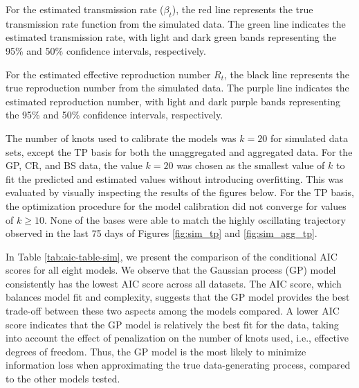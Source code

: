 \documentclass[
11pt, %
oneside, %
english, %
singlespacing, %
]{macthesis} %
\begin{document}
For the estimated transmission rate (\(\beta_t\)), the red line represents the true transmission rate function from the simulated data. The green line indicates the estimated transmission rate, with light and dark green bands representing the 95\% and 50\% confidence intervals, respectively.

For the estimated effective reproduction number \(R_t\), the black line represents the true reproduction number from the simulated data. The purple line indicates the estimated reproduction number, with light and dark purple bands representing the 95\% and 50\% confidence intervals, respectively.

The number of knots used to calibrate the models was \(k =20\) for simulated data sets, except the TP basis for both the unaggregated and aggregated data. For the GP, CR, and BS data, the value \(k =20\) was chosen as the smallest value of \(k\) to fit the predicted and estimated values without introducing overfitting. This was evaluated by visually inspecting the results of the figures below. For the TP basis, the optimization procedure for the model calibration did not converge for values of \(k \geq 10\). None of the bases were able to match the highly oscillating trajectory observed in the last 75 days of Figures \ref{fig:sim_tp} and \ref{fig:sim_agg_tp}.

In Table \ref{tab:aic-table-sim}, we present the comparison of the conditional AIC scores for all eight models. We observe that the Gaussian process (GP) model consistently has the lowest AIC score across all datasets. The AIC score, which balances model fit and complexity, suggests that the GP model provides the best trade-off between these two aspects among the models compared. A lower AIC score indicates that the GP model is relatively the best fit for the data, taking into account the effect of penalization on the number of knots used, i.e., effective degrees of freedom. Thus, the GP model is the most likely to minimize information loss when approximating the true data-generating process, compared to the other models tested.
\end{document}
